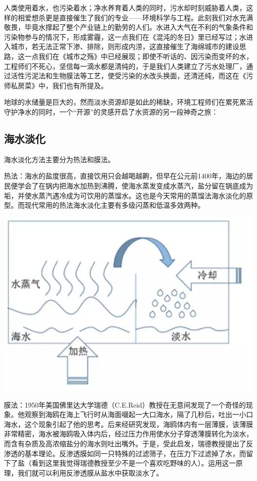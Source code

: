 \documentclass[]{book}
\begin{document}
人类使用着水，也污染着水；净水养育着人类的同时，污水却时刻威胁着人类，这样的相爱想杀更是直接催生了我们的专业------环境科学与工程。此刻我们对水充满敬畏，毕竟水撑起了整个产业链上的勤劳的人们。水进入大气在不利的气象条件和污染物参与的情况下，形成雾霾，这一点我们在《混沌的冬日》里已经写过；水进入城市，若无法正常下渗、排除，则形成内涝，这直接催生了海绵城市的建设思路，这一点我们在《城市之殇》中已经展现；即使不听话的、因污染而变坏的水，工程师们不死心，坚信每一滴水都是清纯的，于是我们人类建立了污水处理厂，通过活性污泥法和生物膜法等工艺，使受污染的水改头换面，还清还纯，而这在《污师私房菜》中，我们也有所提及。

地球的水储量是巨大的，然而淡水资源却是如此的稀缺，环境工程师们在累死累活守护净水的同时，一个``开源''的灵感开启了水资源的另一段神奇之旅：

\subsection{海水淡化}

海水淡化方法主要分为热法和膜法。

热法：海水的盐度很高，直接饮用只会越喝越齁，但早在公元前1400年，海边的居民便学会了在锅内把海水加热到沸腾，使海水蒸发变成水蒸汽，盐分留在锅底成为垢，并使水蒸汽遇冷成为可饮用的蒸馏水。这也是今天常用的蒸馏法海水淡化的原型。而现代常用的热法海水淡化主要有多级闪蒸和低温多效两种。

\includegraphics[width=8.33in]{images/seawater1}

膜法：1950年美国佛里达大学瑞德（C.E.Reid）教授在无意间发现了一个奇怪的现象。他观察到海鸥在海上飞行时从海面啜起一大口海水，隔了几秒后，吐出一小口海水，这个现象引起了他的思考。后来经研究发现，海鸥体内有一层薄膜，该薄膜非常精密，海水被海鸥吸入体内后，经过压力作用使水分子穿透薄膜转化为淡水，而含有杂质及高浓缩盐分的海水则吐出嘴外。于是，受此启发，瑞德教授提出了反渗透的基本理论。反渗透膜如同一只特殊的过滤筛子，在压力下过滤掉了水，而留下了盐（看到这里我觉得瑞德教授至少不是一个喜欢吃野味的人）。运用这一原理，我们就可以利用反渗透膜从盐水中获取淡水了。
\end{document}
